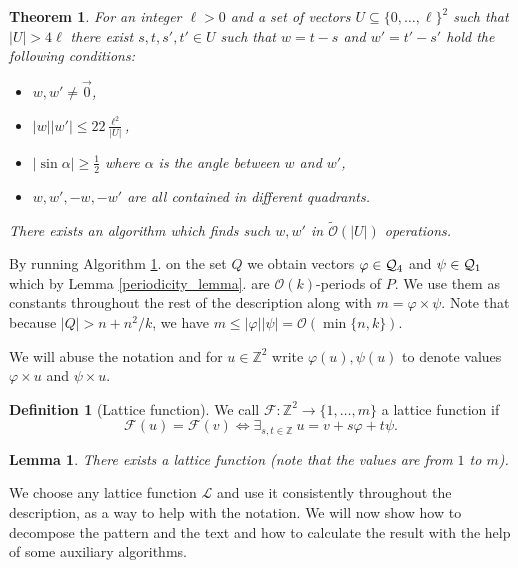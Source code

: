 \documentclass[11pt]{article}
\newcommand{\Z}{\mathbb{Z}}
\renewcommand{\O}{\mathcal{O}}
\newcommand{\tO}{\tilde{\mathcal{O}}}
\renewcommand{\phi}{\varphi}
\newcommand{\set}[1]{\lbrace #1 \rbrace}
\theoremstyle{plain}
\newtheorem{theorem}{Theorem}
\newtheorem{lemma}{Lemma}
\theoremstyle{definition}
\newtheorem{definition}{Definition}
\begin{document}
\begin{theorem}
	\label{get_periods}
	For an integer $\ell > 0$ and a set of vectors $U \subseteq \set{0, \dots, \ell}^2 $ such that $|U| > 4\ell$ there exist $s, t, s', t' \in U$ such that $w = t - s$ and $w' = t' - s'$ hold the following conditions:
	\begin{itemize}
		\item $w, w' \neq \vec{0}$,
		\item $|w||w'| \le 22\frac{\ell^2}{|U|}$,
		\item $|\sin \alpha| \ge \frac{1}{2}$ where $\alpha$ is the angle between $w$ and $w'$,
		\item $w, w', -w, -w'$ are all contained in different quadrants.
	\end{itemize}
	There exists an algorithm which finds such $w, w'$ in $\tO(|U|)$ operations.
\end{theorem}


By running Algorithm \ref{get_periods}. on the set $Q$ we obtain vectors $\phi \in \Q_4$ and $\psi \in \mathcal{Q}_1$ which by Lemma \ref{periodicity_lemma}. are $\O(k)$-periods of $P$.
We use them as constants throughout the rest of the description along with $m = \phi \times \psi$.
Note that because $|Q| > n + n^2 / k$, we have $m \le |\phi||\psi| = \O(\min\set{n, k})$.

We will abuse the notation and for $u \in \Z^2$ write $\phi(u), \psi(u)$ to denote values $\phi \times u$ and $\psi \times u$.


\renewcommand{\L}{\mathcal{L}}
\begin{definition}[Lattice function]
	We call $\mathcal{F} : \Z^2 \to \set{1, \dots, m}$ a lattice function if
	$$ \mathcal{F}(u) = \mathcal{F}(v) \Longleftrightarrow \exists_{s, t \in \Z} \ u = v + s\phi + t\psi. $$
\end{definition}
\begin{lemma}
	There exists a lattice function (note that the values are from $1$ to $m$).
\end{lemma}


We choose any lattice function $\L$ and use it consistently throughout the description, as a way to help with the notation.
We will now show how to decompose the pattern and the text and how to calculate the result with the help of some auxiliary algorithms.
\end{document}
